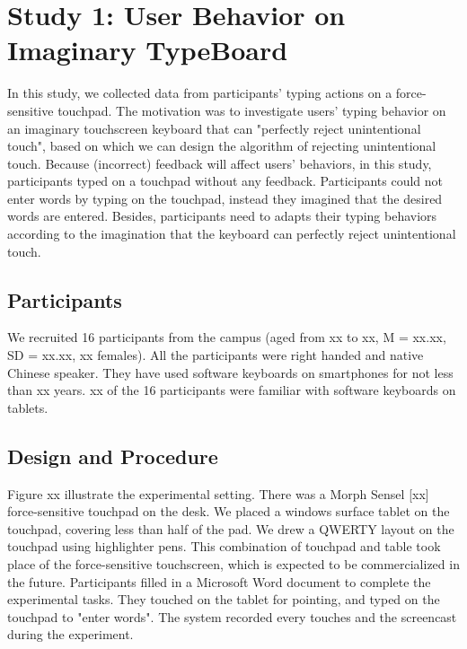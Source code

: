 \section{Study 1: User Behavior on Imaginary TypeBoard}

In this study, we collected data from participants' typing actions on a force-sensitive touchpad. The motivation was to investigate users' typing behavior on an imaginary touchscreen keyboard that can "perfectly reject unintentional touch", based on which we can design the algorithm of rejecting unintentional touch. Because (incorrect) feedback will affect users' behaviors, in this study, participants typed on a touchpad without any feedback. Participants could not enter words by typing on the touchpad, instead they imagined that the desired words are entered. Besides, participants need to adapts their typing behaviors according to the imagination that the keyboard can perfectly reject unintentional touch.


\subsection{Participants}

We recruited 16 participants from the campus (aged from xx to xx, M = xx.xx, SD = xx.xx, xx females). All the participants were right handed and native Chinese speaker. They have used software keyboards on smartphones for not less than xx years. xx of the 16 participants were familiar with software keyboards on tablets.

\subsection{Design and Procedure}

Figure xx illustrate the experimental setting. There was a Morph Sensel [xx] force-sensitive touchpad on the desk. We placed a windows surface tablet on the touchpad, covering less than half of the pad. We drew a QWERTY layout on the touchpad using highlighter pens. This combination of touchpad and table took place of the force-sensitive touchscreen, which is expected to be commercialized in the future. Participants filled in a Microsoft Word document to complete the experimental tasks. They touched on the tablet for pointing, and typed on the touchpad to "enter words". The system recorded every touches and the screencast during the experiment.

